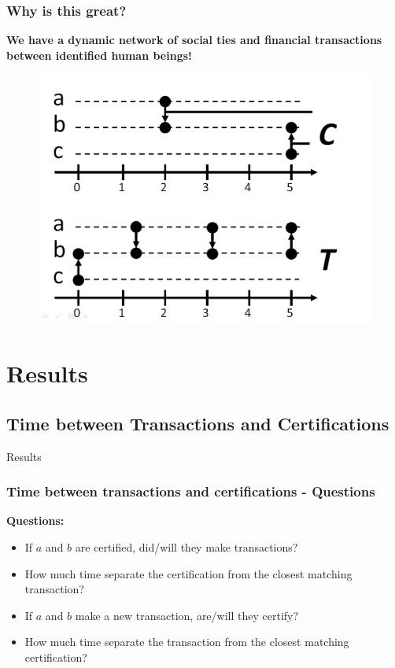 \documentclass{beamer}
\begin{document}

\begin{frame}
	\frametitle{Why is this great?}
	\textbf{{\footnotesize We have a dynamic network of social ties and financial transactions between identified human beings!}}
	\begin{center}
		\begin{figure}
			\includegraphics[width=.8\linewidth]{./figures/delta-t-0}
		\end{figure}
	\end{center}
\end{frame}


\section{Results}

\subsection{Time between Transactions and Certifications}

\begin{frame}
	\Huge{\centerline{Results}}
\end{frame}


\begin{frame}
	\frametitle{Time between transactions and certifications - \textbf{Questions}}
	{\Large \textbf{Questions:}}
	\bigskip
	\begin{itemize}
		\item<1-> If $a$ and $b$ are certified, did/will they make transactions? 
		\medskip
		\item<2-> How much time separate the certification from the closest matching transaction?
		\medskip
		\item<3-> If $a$ and $b$ make a new transaction, are/will they certify?
		\medskip
		\item<4-> How much time separate the transaction from the closest matching certification?
	\end{itemize}
\end{frame}
\end{document}
